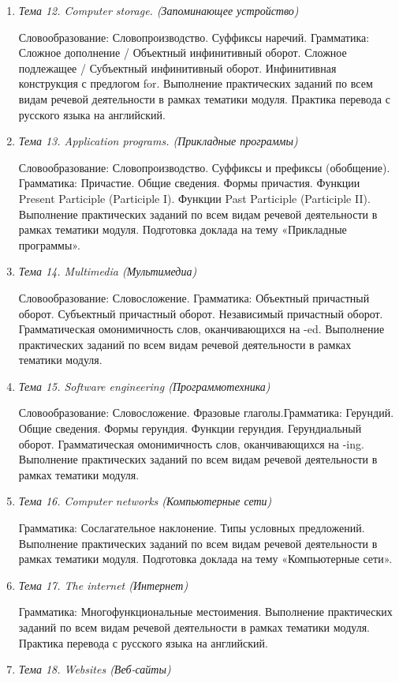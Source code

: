 \begin{enumerate}
\item \textit{Тема 12. Computer storage. (Запоминающее устройство)}\par
Словообразование: Словопроизводство. Суффиксы наречий.
Грамматика: Сложное дополнение / Объектный инфинитивный оборот. Сложное подлежащее / Субъектный инфинитивный оборот. Инфинитивная конструкция с предлогом for.
Выполнение практических заданий по всем видам речевой деятельности в рамках тематики модуля. Практика перевода с русского языка на английский.
\item \textit{Тема 13. Application programs. (Прикладные программы)}\par
Словообразование: Словопроизводство. Суффиксы и префиксы (обобщение). Грамматика: Причастие. Общие сведения. Формы причастия. Функции Present Participle (Participle I). Функции Past Participle (Participle II). Выполнение практических заданий по всем видам речевой деятельности в рамках тематики модуля. Подготовка доклада на тему «Прикладные программы».
\item \textit{Тема 14. Multimedia (Мультимедиа)}\par
Словообразование: Словосложение. Грамматика: Объектный причастный оборот. Субъектный причастный оборот. Независимый причастный оборот. Грамматическая омонимичность слов, оканчивающихся на -ed.
Выполнение практических заданий по всем видам речевой деятельности в рамках тематики модуля. 
\item \textit{Тема 15. Software engineering (Программотехника)}\par
Словообразование: Словосложение. Фразовые глаголы.Грамматика: Герундий. Общие сведения. Формы герундия.  Функции герундия. Герундиальный оборот. Грамматическая омонимичность слов, оканчивающихся на -ing. Выполнение практических заданий по всем видам речевой деятельности в рамках тематики модуля. 
\item \textit{Тема 16. Computer networks (Компьютерные сети)}\par
Грамматика: Сослагательное наклонение. Типы условных предложений. Выполнение практических заданий по всем видам речевой деятельности в рамках тематики модуля. Подготовка доклада на тему «Компьютерные сети».
\item \textit{Тема 17. The internet (Интернет)}\par
Грамматика: Многофункциональные местоимения. Выполнение практических заданий по всем видам речевой деятельности в рамках тематики модуля. Практика перевода с русского языка на английский.
\item \textit{Тема 18. Websites (Веб-сайты)}\par

\end{enumerate}
